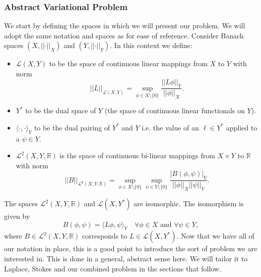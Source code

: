 \documentclass[12pt,a4paper]{article}
\theoremstyle{definition}
\begin{document}
\subsubsection{Abstract Variational Problem}\label{subsec_verf_abst_var_prob}
We start by defining the spaces in which we will present our problem.  We will adopt the same notation and spaces as \cite[\S4.1.1]{verfurth2013posteriori} for ease of reference.  Consider Banach spaces $\left(X,\left|\left|\cdot\right|\right|_X\right)$ and $\left(Y,\left|\left|\cdot\right|\right|_Y\right)$. In this context we  define:
\begin{itemize}
	\item $\mathcal{L}\left(X,Y\right)$ to be the space of continuous linear mappings from $X$ to $Y$ with norm 
	\begin{equation}
	\left|\left|L\right|\right|_{\mathcal{L}\left(X,Y\right)} = \sup_{\phi \in X\setminus\lbrace 0\rbrace}\frac{\left|\left|L\phi\right|\right|_Y}{\left|\left|\phi\right|\right|_X}.
	\end{equation}
	\item $Y^*$ to be the dual space of $Y$ (the space of continuous linear functionals on $Y$).
	\item $\langle \cdot,\cdot\rangle_Y$ to be the dual pairing of $Y^*$ and $Y$ i.e. the value of an $\ell\in Y^*$ applied to a $\psi\in Y $.
	\item $\mathcal{L}^2\left(X,Y,\mathbb{R}\right)$ is the space of continuous bi-linear mappings from $X\times Y$ to $\mathbb{R}$ with norm
	\begin{equation}
	\left|\left|B\right|\right|_{\mathcal{L}^2\left(X,Y,\mathbb{R}\right)} = \sup_{\phi \in X\setminus\lbrace 0\rbrace}\sup_{\psi \in Y\setminus\lbrace 0\rbrace}\frac{\left|B\left(\phi,\psi\right)\right|_Y}{\left|\left|\phi\right|\right|_X\left|\left|\psi\right|\right|_Y}.
	\end{equation}
\end{itemize}
The spaces $\mathcal{L}^2\left(X,Y,\mathbb{R}\right)$ and $\mathcal{L}\left(X,Y^*\right)$ are isomorphic.  The isomorphism is given by 
\begin{equation}\label{verf_isomorphism}
B\left(\phi,\psi\right)=\langle L\phi,\psi\rangle_Y\quad \forall \phi \in X\text{ and }\forall \psi \in Y,
\end{equation}
where $B\in \mathcal{L}^2\left(X,Y,\mathbb{R}\right)$ corresponds to $L\in \mathcal{L}\left(X,Y^*\right)$.  Now that we have all of our notation in place, this is a good point to introduce the sort of problem we are interested in.  This is done in a general, abstract sense here.  We will tailor it to Laplace, Stokes and our combined problem in the sections that follow.
\end{document}
